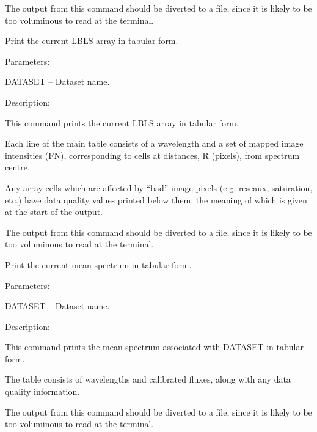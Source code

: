 \begin {description}
\begin {description}
The output from this command should be diverted to a file, since
it is likely to be too voluminous to read at the terminal.
\end {description}

\item [PRLBLS]
Print the current LBLS array in tabular form.

\begin {description}
\item Parameters:

\begin {description}
\item DATASET -- Dataset name.
\end {description}

\item Description:

This command prints the current LBLS array in tabular form.

Each line of the main table consists of a wavelength and a set of
mapped image intensities (FN), corresponding to cells at distances, R (pixels),
from spectrum centre.

Any array cells which are affected by ``bad'' image pixels (e.g. reseaux,
saturation, etc.) have data quality values printed below them, the
meaning of which is given at the start of the output.

The output from this command should be diverted to a file, since
it is likely to be too voluminous to read at the terminal.
\end {description}

\item [PRMEAN]
Print the current mean spectrum in tabular form.

\begin {description}
\item Parameters:

\begin {description}
\item DATASET -- Dataset name.
\end {description}

\item Description:

This command prints the mean spectrum associated with DATASET in tabular form.

The table consists of wavelengths and calibrated fluxes, along
with any data quality information.

The output from this command should be diverted to a file, since
it is likely to be too voluminous to read at the terminal.
\end {description}


\end{description}
